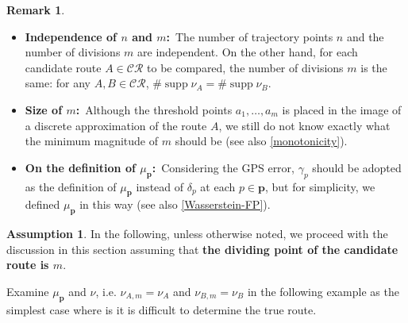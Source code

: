 \documentclass{article}
\numberwithin{equation}{section}
\theoremstyle{definition}
\newtheorem{remark}[remark]{Remark}
\newtheorem{assumption}[assumption]{Assumption}
\newcommand{\CR}{\mathcal{CR}}
\DeclareMathOperator\supp{supp} %
\begin{document}
\begin{remark}
$ $\newline
\begin{itemize} \vspace{-6mm}
\item \textbf{Independence of $n$ and $m$:}\,
The number of trajectory points $n$ and the number of divisions $m$ are independent.
On the other hand, for each candidate route $A\in\CR$ to be compared, the number of divisions $m$ is the same:
for any $A,B\in\CR$, $\#\supp\nu_{A}=\#\supp\nu_{B}$.\vspace{-2mm}
\item \textbf{Size of $m$:}\,
Although the threshold points $a_1,\dots,a_m$ is placed in the image of a discrete approximation of the route $A$, we still do not know exactly what the minimum magnitude of $m$ should be (see also \autoref{monotonicity}). \vspace{-2mm}
\item \textbf{On the definition of $\mu_\mathbf{p}$:}\,
Considering the GPS error, $\gamma_p$ should be adopted as the definition of $\mu_\mathbf{p}$ instead of $\delta_p$ at each $p\in\mathbf{p}$, but for simplicity, we defined $\mu_\mathbf{p}$ in this way (see also \autoref{Wasserstein-FP}).
\end{itemize}
\end{remark}

\begin{assumption}
In the following, unless otherwise noted, we proceed with the discussion in this section assuming that \textbf{the dividing point of the candidate route is $m$}.
\end{assumption}

Examine $\mu_\mathbf{p}$ and $\nu$, i.e. $\nu_{A,m}=\nu_A$ and $\nu_{B,m}=\nu_B$ in the following example as the simplest case where is it is difficult to determine the true route.
\end{document}
